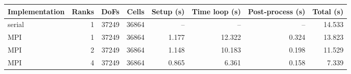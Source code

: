 \begin{center}
\small
\begin{tabular}{lrrrrrrr}
\toprule
Implementation & Ranks & DoFs & Cells & Setup (s) & Time loop (s) & Post-process (s) & Total (s) \\
\midrule
serial & 1 & 37249 & 36864 & -- & -- & -- & 14.533 \\
MPI & 1 & 37249 & 36864 & 1.177 & 12.322 & 0.324 & 13.823 \\
MPI & 2 & 37249 & 36864 & 1.148 & 10.183 & 0.198 & 11.529 \\
MPI & 4 & 37249 & 36864 & 0.865 & 6.361 & 0.158 & 7.339 \\
\bottomrule
\end{tabular}
\end{center}
